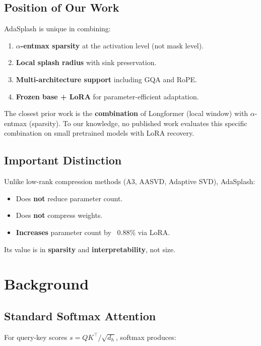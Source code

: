 \subsection{Position of Our Work}

AdaSplash is unique in combining:
\begin{enumerate}
\item \textbf{$\alpha$-entmax sparsity} at the activation level (not mask level).
\item \textbf{Local splash radius} with sink preservation.
\item \textbf{Multi-architecture support} including GQA and RoPE.
\item \textbf{Frozen base + LoRA} for parameter-efficient adaptation.

\end{enumerate}
The closest prior work is the \textbf{combination} of Longformer (local window) 
with $\alpha$-entmax (sparsity). To our knowledge, no published work evaluates this 
specific combination on small pretrained models with LoRA recovery.

\subsection{Important Distinction}

Unlike low-rank compression methods (A3, AASVD, Adaptive SVD), AdaSplash:
\begin{itemize}
\item Does \textbf{not} reduce parameter count.
\item Does \textbf{not} compress weights.
\item \textbf{Increases} parameter count by ~0.88\% via LoRA.

\end{itemize}
Its value is in \textbf{sparsity} and \textbf{interpretability}, not size.


\section{Background}

\subsection{Standard Softmax Attention}

For query-key scores $s = Q K^\top / \sqrt{d_h}$, softmax produces:

